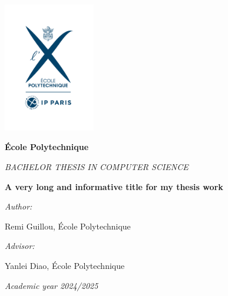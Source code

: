 \documentclass[oneside, a4paper, onecolumn, 11pt]{article}
\newcommand{\thesistitle}[0]{A very long and informative title for my thesis work}
\newcommand{\authorname}[0]{Remi Guillou}
\newcommand{\supervisor}[0]{Yanlei Diao}
\newcommand{\supervisorinstitution}[0]{École Polytechnique}
\begin{document}



\hspace{0pt}
\vfill

\begin{center}

\includegraphics[width=0.3\textwidth]{images/logo-EP-vertical}

\vspace*{2em}
%
{\large
\textbf{\'Ecole Polytechnique}

\vspace*{1em}
\textit{BACHELOR THESIS IN COMPUTER SCIENCE}


\vspace*{3em}
{\Huge \textbf{\thesistitle}}
\vspace*{3em}



\textit{Author:}

\vspace*{1em}
\authorname{}, \'Ecole Polytechnique

\vspace*{2em}
%
{\textit{Advisor:}}

\vspace*{1em}
\supervisor{}, \supervisorinstitution{}
}

\vspace*{2em}
\textit{Academic year 2024/2025}

\end{center}

\vfill
\hspace{0pt}
\end{document}
